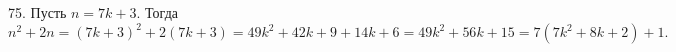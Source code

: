 75. Пусть $n=7k+3.$ Тогда $n^2+2n=(7k+3)^2+2(7k+3)=49k^2+42k+9+14k+6=49k^2+56k+15=7(7k^2+8k+2)+1.$\\
